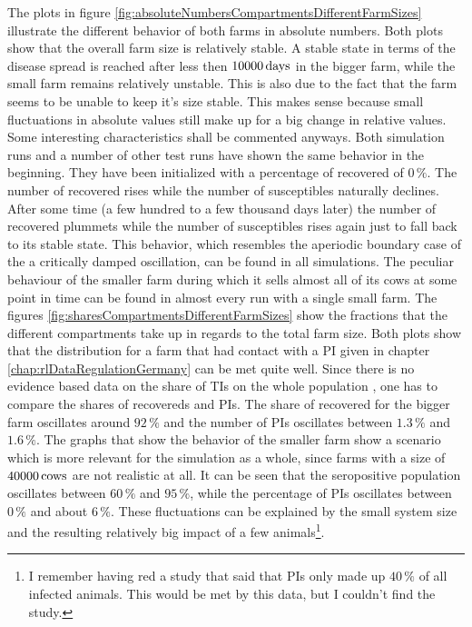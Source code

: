 The plots in figure \ref{fig:absoluteNumbersCompartmentsDifferentFarmSizes} illustrate the different behavior of both farms in absolute numbers. Both plots show that the overall farm size is relatively stable. A stable state in terms of the disease spread is reached after less then $10000\,\text{days}$ in the bigger farm, while the small farm remains relatively unstable. This is also due to the fact that the farm seems to be unable to keep it's size stable. This makes sense because small fluctuations in absolute values still make up for a big change in relative values. Some interesting characteristics shall be commented anyways. Both simulation runs and a number of other test runs have shown the same behavior in the beginning. They have been initialized with a percentage of recovered of $0\,\%$. The number of recovered rises while the number of susceptibles naturally declines. After some time (a few hundred to a few thousand days later) the number of recovered plummets while the number of susceptibles rises again just to fall back to its stable state. This behavior, which resembles the aperiodic boundary case of the a critically damped oscillation, can be found in all simulations. The peculiar behaviour of the smaller farm during which it sells almost all of its cows at some point in time can be found in almost every run with a single small farm. 
The figures \ref{fig:sharesCompartmentsDifferentFarmSizes} show the fractions that the different compartments take up in regards to the total farm size. Both plots show that the distribution for a farm that had contact with a PI given in chapter \ref{chap:rlDataRegulationGermany}  can be met quite well. Since there is no evidence based data on the share of TIs on the whole population \citep{personalCom}, one has to compare the shares of recovereds and PIs. The share of recovered for the bigger farm oscillates around $92\,\%$ and the number of PIs oscillates between $1.3\,\%$ and $1.6\,\%$. The graphs that show the behavior of the smaller farm show a scenario which is more relevant for the simulation as a whole, since farms with a size of $40000\,\text{cows}$ are not realistic at all. It can be seen that the seropositive population oscillates between $60\,\%$ and $95\,\%$, while the percentage of PIs oscillates between $0\,\%$ and about $6\,\%$. These fluctuations can be explained by the small system size and the resulting relatively big impact of a few animals\footnote{I remember having red a study that said that PIs only made up $40\,\%$ of all infected animals. This would be met by this data, but I couldn't find the study.}. 

